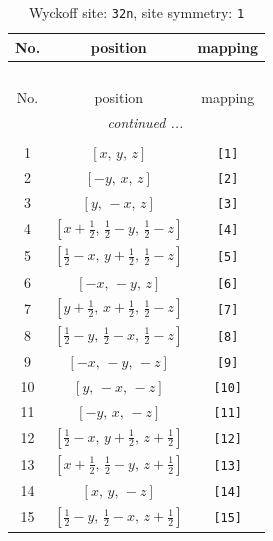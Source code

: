 \documentclass[fleqn,8pt]{jsarticle}
\begin{document}
\renewcommand{\arraystretch}{1.2}
\begin{longtable}{ccc}
\caption{Wyckoff site: {\tt 32n}, site symmetry: {\tt 1}}
 \\
 \hline \hline
No. & position & mapping \\ \hline \endfirsthead

\multicolumn{2}{l}{\tablename\ \thetable{}} \\
 \hline \hline
No. & position & mapping \\ \hline \endhead

 \hline \hline
\multicolumn{2}{r}{\footnotesize\it continued ...} \\ \endfoot

 \hline \hline
\multicolumn{2}{r}{} \\ \endlastfoot

1 & $\left[ x,\, y,\, z \right]$ & {\tt [1]} \\ \hline
2 & $\left[ - y,\, x,\, z \right]$ & {\tt [2]} \\ \hline
3 & $\left[ y,\, - x,\, z \right]$ & {\tt [3]} \\ \hline
4 & $\left[ x + \frac{1}{2},\, \frac{1}{2} - y,\, \frac{1}{2} - z \right]$ & {\tt [4]} \\ \hline
5 & $\left[ \frac{1}{2} - x,\, y + \frac{1}{2},\, \frac{1}{2} - z \right]$ & {\tt [5]} \\ \hline
6 & $\left[ - x,\, - y,\, z \right]$ & {\tt [6]} \\ \hline
7 & $\left[ y + \frac{1}{2},\, x + \frac{1}{2},\, \frac{1}{2} - z \right]$ & {\tt [7]} \\ \hline
8 & $\left[ \frac{1}{2} - y,\, \frac{1}{2} - x,\, \frac{1}{2} - z \right]$ & {\tt [8]} \\ \hline
9 & $\left[ - x,\, - y,\, - z \right]$ & {\tt [9]} \\ \hline
10 & $\left[ y,\, - x,\, - z \right]$ & {\tt [10]} \\ \hline
11 & $\left[ - y,\, x,\, - z \right]$ & {\tt [11]} \\ \hline
12 & $\left[ \frac{1}{2} - x,\, y + \frac{1}{2},\, z + \frac{1}{2} \right]$ & {\tt [12]} \\ \hline
13 & $\left[ x + \frac{1}{2},\, \frac{1}{2} - y,\, z + \frac{1}{2} \right]$ & {\tt [13]} \\ \hline
14 & $\left[ x,\, y,\, - z \right]$ & {\tt [14]} \\ \hline
15 & $\left[ \frac{1}{2} - y,\, \frac{1}{2} - x,\, z + \frac{1}{2} \right]$ & {\tt [15]} \\ \hline

\end{longtable}
\end{document}
